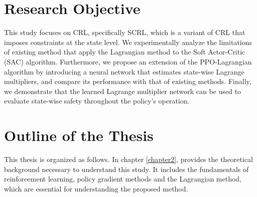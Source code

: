 \section{Research Objective}

This study focuses on CRL, specifically SCRL, which is a variant of CRL that imposes constraints at the state level.
We experimentally analyze the limitations of existing method that apply the Lagrangian method to the Soft Actor-Critic (SAC) algorithm.
Furthermore, we propose an extension of the PPO-Lagrangian algorithm by introducing a neural network that estimates state-wise Lagrange multipliers, and compare its performance with that of existing methods.
Finally, we demonstrate that the learned Lagrange multiplier network can be used to evaluate state-wise safety throughout the policy's operation.

\section{Outline of the Thesis}

This thesis is organized as follows. In chapter \ref{chapter2}, provides the theoretical background necessary to understand this study.
It includes the fundamentals of reinforcement learning, policy gradient methods and the Lagrangian method, which are essential for understanding the proposed method.